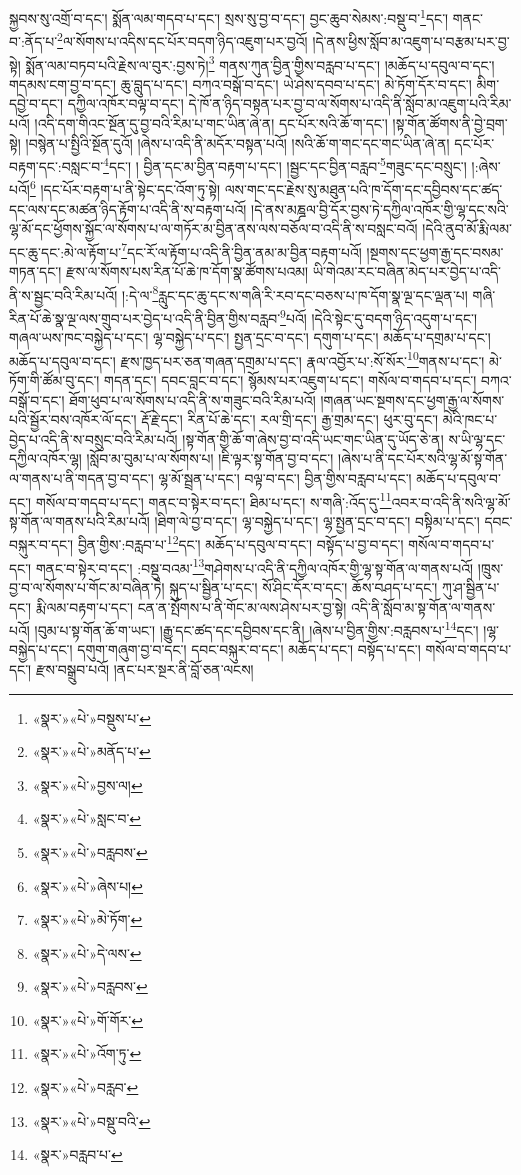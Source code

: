 སྐྱབས་སུ་འགྲོ་བ་དང་། སྨོན་ལམ་གདབ་པ་དང་། སྲས་སུ་བྱ་བ་དང་། བྱང་ཆུབ་སེམས་:བསྡུ་བ་\footnote{«སྣར་»«པེ་»བསྡུས་པ་}དང་། གནང་བ་:ནོད་པ་\footnote{«སྣར་»«པེ་»མནོད་པ་}ལ་སོགས་པ་འདིས་དང་པོར་བདག་ཉིད་འཇུག་པར་བྱའོ། །དེ་ནས་ཕྱིས་སློབ་མ་འཇུག་པ་བརྩམ་པར་བྱ་སྟེ། སྨོན་ལམ་བཏབ་པའི་རྗེས་ལ་བུར་:བྱས་ཏེ།\footnote{«སྣར་»«པེ་»བྱས་ལ།} གནས་ཀུན་བྱིན་གྱིས་བརླབ་པ་དང་། །མཆོད་པ་དབུལ་བ་དང་། གདམས་ངག་བྱ་བ་དང་། ཆུ་བླུད་པ་དང་། བཀའ་བསྒོ་བ་དང་། ཡེ་ཤེས་དབབ་པ་དང་། མེ་ཏོག་དོར་བ་དང་། མིག་དབྱེ་བ་དང་། དཀྱིལ་འཁོར་བལྟ་བ་དང་། དེ་ཁོ་ན་ཉིད་བསྟན་པར་བྱ་བ་ལ་སོགས་པ་འདི་ནི་སློབ་མ་འཇུག་པའི་རིམ་པའོ། །འདི་དག་གིའང་སྔོན་དུ་བྱ་བའི་རིམ་པ་གང་ཡིན་ཞེ་ན། དང་པོར་སའི་ཆོ་ག་དང་། །སྟ་གོན་ཚོགས་ནི་བྱེ་བྲག་སྟེ། །བསྙེན་པ་སྤྱིའི་སྔོན་དུའོ། །ཞེས་པ་འདི་ནི་མདོར་བསྟན་པའོ། །སའི་ཆོ་ག་གང་དང་གང་ཡིན་ཞེ་ན། དང་པོར་བརྟག་དང་:བསླང་བ་\footnote{«སྣར་»«པེ་»སླང་བ་}དང་། །
བྱིན་དང་མ་བྱིན་བརྟག་པ་དང་། །སྦྱང་དང་བྱིན་བརླབ་\footnote{«སྣར་»«པེ་»བརླབས་}གཟུང་དང་བསྲུང་། །:ཞེས་པའོ།\footnote{«སྣར་»«པེ་»ཞེས་པ།} །དང་པོར་བརྟག་པ་ནི་སྟེང་དང་འོག་ཏུ་སྟེ། ལས་གང་དང་རྗེས་སུ་མཐུན་པའི་ཁ་དོག་དང་དབྱིབས་དང་ཚད་དང་ལས་དང་མཚན་ཉིད་རྟོག་པ་འདི་ནི་ས་བརྟག་པའོ། །དེ་ནས་མཎྜལ་བྱི་དོར་བྱས་ཏེ་དཀྱིལ་འཁོར་གྱི་ལྷ་དང་སའི་ལྷ་མོ་དང་ཕྱོགས་སྐྱོང་ལ་སོགས་པ་ལ་གཏོར་མ་བྱིན་ནས་ལས་བཅོལ་བ་འདི་ནི་ས་བསླང་བའོ། །དེའི་ནུབ་མོ་རྨི་ལམ་དང་ཆུ་དང་:མེ་ལ་རྟོག་པ་\footnote{«སྣར་»«པེ་»མེ་ཏོག་}དང་རོ་ལ་རྟོག་པ་འདི་ནི་བྱིན་ནམ་མ་བྱིན་བརྟག་པའོ། །སྔགས་དང་ཕྱག་རྒྱ་དང་བསམ་གཏན་དང་། རྫས་ལ་སོགས་པས་རིན་པོ་ཆེ་ཁ་དོག་སྣ་ཚོགས་པའམ། ཡི་གེའམ་རང་བཞིན་མེད་པར་བྱེད་པ་འདི་ནི་ས་སྦྱང་བའི་རིམ་པའོ། །:དེ་ལ་\footnote{«སྣར་»«པེ་»དེ་ལས་}རླུང་དང་ཆུ་དང་ས་གཞི་རི་རབ་དང་བཅས་པ་ཁ་དོག་སྣ་ལྔ་དང་ལྡན་པ། གཞི་རིན་པོ་ཆེ་སྣ་ལྔ་ལས་གྲུབ་པར་བྱེད་པ་འདི་ནི་བྱིན་གྱིས་བརླབ་\footnote{«སྣར་»«པེ་»བརླབས་}པའོ། །དེའི་སྟེང་དུ་བདག་ཉིད་འདུག་པ་དང་། གཞལ་ཡས་ཁང་བསྐྱེད་པ་དང་། ལྷ་བསྐྱེད་པ་དང་། སྤྱན་དྲང་བ་དང་། དགུག་པ་དང་། མཆོད་པ་དགྲམ་པ་དང་། མཆོད་པ་དབུལ་བ་དང་། རྫས་ཁྱད་པར་ཅན་གཞན་དགྲམ་པ་དང་། རྣལ་འབྱོར་པ་:སོ་སོར་\footnote{«སྣར་»«པེ་»གོ་གོར་}གནས་པ་དང་། མེ་ཏོག་གི་ཚོམ་བུ་དང་། གདན་དང་། དབང་བླང་བ་དང་། སྙོམས་པར་འཇུག་པ་དང་། གསོལ་བ་གདབ་པ་དང་། བཀའ་བསྒོ་བ་དང་། ཐོག་ཕུབ་པ་ལ་སོགས་པ་འདི་ནི་ས་གཟུང་བའི་རིམ་པའོ། །གཞན་ཡང་སྔགས་དང་ཕྱག་རྒྱ་ལ་སོགས་པའི་སྦྱོར་བས་འཁོར་ལོ་དང་། རྡོ་རྗེ་དང་། རིན་པོ་ཆེ་དང་། རལ་གྲི་དང་། རྒྱ་གྲམ་དང་། ཕུར་བུ་དང་། མེའི་ཁང་པ་བྱེད་པ་འདི་ནི་ས་བསྲུང་བའི་རིམ་པའོ། །སྟ་གོན་གྱི་ཆོ་ག་ཞེས་བྱ་བ་འདི་ཡང་གང་ཡིན་དུ་ཡོད་ཅེ་ན། ས་ཡི་ལྷ་དང་དཀྱིལ་འཁོར་ལྷ། །སློབ་མ་བུམ་པ་ལ་སོགས་པ། །ཇི་ལྟར་སྟ་གོན་བྱ་བ་དང་། །ཞེས་པ་ནི་དང་པོར་སའི་ལྷ་མོ་སྟ་གོན་ལ་གནས་པ་ནི་གདན་བྱ་བ་དང་། ལྷ་མོ་སྦྲན་པ་དང་། བལྟ་བ་དང་། བྱིན་གྱིས་བརླབ་པ་དང་། མཆོད་པ་དབུལ་བ་དང་། གསོལ་བ་གདབ་པ་དང་། གནང་བ་སྟེར་བ་དང་། ཐིམ་པ་དང་། ས་གཞི་:འོད་དུ་\footnote{«སྣར་»«པེ་»འོག་ཏུ་}འབར་བ་འདི་ནི་སའི་ལྷ་མོ་སྟ་གོན་ལ་གནས་པའི་རིམ་པའོ། །ཐིག་ལེ་བྱ་བ་དང་། ལྷ་བསྐྱེད་པ་དང་། ལྷ་སྤྱན་དྲང་བ་དང་། བསྟིམ་པ་དང་། དབང་བསྐུར་བ་དང་། བྱིན་གྱིས་:བརླབ་པ་\footnote{«སྣར་»«པེ་»བརླབ་}དང་། མཆོད་པ་དབུལ་བ་དང་། བསྟོད་པ་བྱ་བ་དང་། གསོལ་བ་གདབ་པ་དང་། གནང་བ་སྟེར་བ་དང་། :བསྡུ་བའམ་\footnote{«སྣར་»«པེ་»བསྡུ་བའི་}གཤེགས་པ་འདི་ནི་དཀྱིལ་འཁོར་གྱི་ལྷ་སྟ་གོན་ལ་གནས་པའོ། །ཁྲུས་བྱ་བ་ལ་སོགས་པ་གོང་མ་བཞིན་ཏེ། སྐུད་པ་སྦྱིན་པ་དང་། སོ་ཤིང་དོར་བ་དང་། ཆོས་བཤད་པ་དང་། ཀུ་ཤ་སྦྱིན་པ་དང་། རྨི་ལམ་བརྟག་པ་དང་། ངན་ན་སྤོགས་པ་ནི་གོང་མ་ལས་ཤེས་པར་བྱ་སྟེ། འདི་ནི་སློབ་མ་སྟ་གོན་ལ་གནས་པའོ། །བུམ་པ་སྟ་གོན་ཆོ་ག་ཡང་། །རྒྱུ་དང་ཚད་དང་དབྱིབས་དང་ནི། །ཞེས་པ་བྱིན་གྱིས་:བརླབས་པ་\footnote{«སྣར་»བརླབ་པ་}དང་། །ལྷ་བསྐྱེད་པ་དང་། དགུག་གཞུག་བྱ་བ་དང་། དབང་བསྐུར་བ་དང་། མཆོད་པ་དང་། བསྟོད་པ་དང་། གསོལ་བ་གདབ་པ་དང་། རྫས་བསྒྲུབ་པའོ། །ནང་པར་སྔར་ནི་བློ་ཅན་ལངས། 
